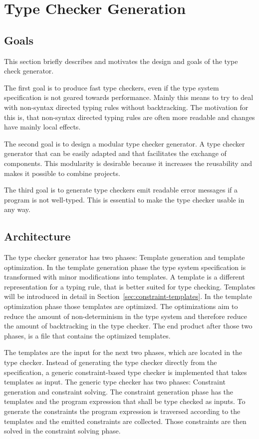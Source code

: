 \chapter{Type Checker Generation}
\section{Goals}
This section briefly describes and motivates the design and goals of
the type check generator.

The first goal is to produce fast type checkers, even if the type
system specification is not geared towards performance. Mainly this
means to try to deal with non-syntax directed typing rules without
backtracking. The motivation for this is, that non-syntax directed
typing rules are often more readable and changes have mainly local
effects.

The second goal is to design a modular type checker generator. A type
checker generator that can be easily adapted and that facilitates the
exchange of components. This modularity is desirable because it
increases the reusability and makes it possible to combine projects.

The third goal is to generate type checkers emit readable error
messages if a program is not well-typed. This is essential to make the
type checker usable in any way.
\section{Architecture}
The type checker generator has two phases: Template generation and
template optimization. In the template generation phase the type
system specification is transformed with minor modifications into
templates. A template is a different representation for a typing rule,
that is better suited for type checking. Templates will be introduced
in detail in Section~\ref{sec:constraint-templates}. In the template
optimization phase those templates are optimized. The optimizations
aim to reduce the amount of non-determinism in the type system and
therefore reduce the amount of backtracking in the type checker. The
end product after those two phases, is a file that contains the
optimized templates.

The templates are the input for the next two phases, which are located
in the type checker. Instead of generating the type checker directly
from the specification, a generic constraint-based type checker is
implemented that takes templates as input. The generic type checker
has two phases: Constraint generation and constraint solving. The
constraint generation phase has the templates and the program
expression that shall be type checked as inputs. To generate the
constraints the program expression is traversed according to the
templates and the emitted constraints are collected. Those constraints
are then solved in the constraint solving phase.

